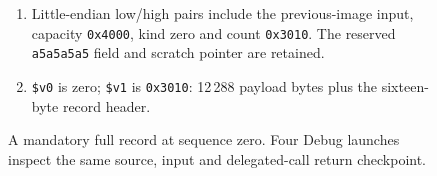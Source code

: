 \begin{figure}[htbp]
\begin{minipage}{\linewidth}
\begin{enumerate}
      \item Little-endian low/high pairs include the previous-image input, capacity \texttt{0x4000}, kind zero and count \texttt{0x3010}. The reserved \texttt{a5a5a5a5} field and scratch pointer are retained.
      \item \texttt{\$v0} is zero; \texttt{\$v1} is \texttt{0x3010}: 12\,288 payload bytes plus the sixteen-byte record header.
    \end{enumerate}
  \end{minipage}
  \caption{A mandatory full record at sequence zero. Four Debug launches inspect the same source, input and delegated-call return checkpoint.}
  \label{fig:video-record-selection}
\end{figure}
